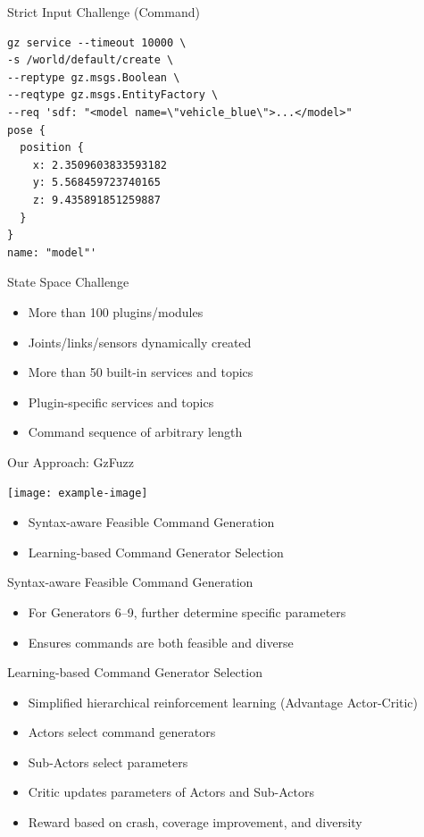 \documentclass{beamer}
\begin{document}
\begin{frame}[fragile]{Strict Input Challenge (Command)}
\begin{verbatim}
gz service --timeout 10000 \
-s /world/default/create \
--reptype gz.msgs.Boolean \
--reqtype gz.msgs.EntityFactory \
--req 'sdf: "<model name=\"vehicle_blue\">...</model>"
pose {
  position {
    x: 2.3509603833593182
    y: 5.568459723740165
    z: 9.435891851259887
  }
}
name: "model"'
\end{verbatim}
\end{frame}

\begin{frame}{State Space Challenge}
\begin{itemize}
\item More than 100 plugins/modules
\item Joints/links/sensors dynamically created
\item More than 50 built-in services and topics
\item Plugin-specific services and topics
\item Command sequence of arbitrary length
\end{itemize}
\end{frame}

\begin{frame}{Our Approach: GzFuzz}
\begin{center}
\texttt{[image: example-image]}
\end{center}
\begin{itemize}
\item Syntax-aware Feasible Command Generation
\item Learning-based Command Generator Selection
\end{itemize}
\end{frame}

\begin{frame}{Syntax-aware Feasible Command Generation}
\begin{itemize}
\item For Generators 6–9, further determine specific parameters
\item Ensures commands are both feasible and diverse
\end{itemize}
\end{frame}

\begin{frame}{Learning-based Command Generator Selection}
\begin{itemize}
\item Simplified hierarchical reinforcement learning (Advantage Actor-Critic)
\item Actors select command generators
\item Sub-Actors select parameters
\item Critic updates parameters of Actors and Sub-Actors
\item Reward based on crash, coverage improvement, and diversity
\end{itemize}
\end{frame}
\end{document}
